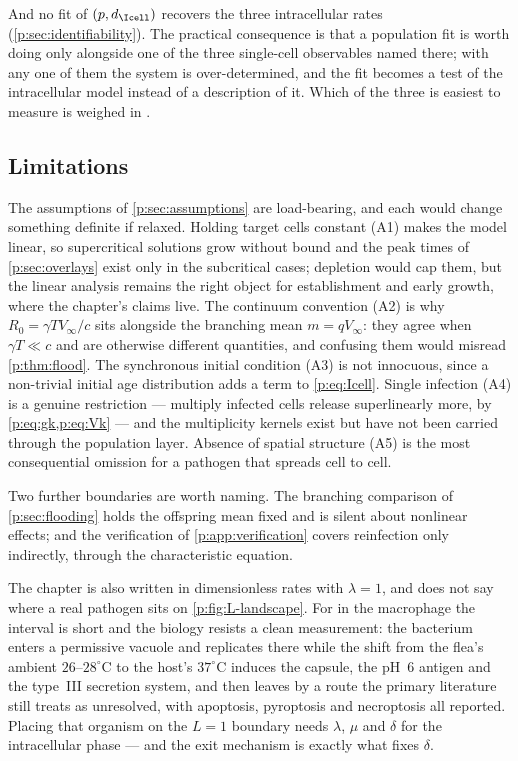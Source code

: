 And no fit of $(p,d_{\Icell})$ recovers the three intracellular rates
(\cref{p:sec:identifiability}). The practical consequence is that a
population fit is worth doing only alongside one of the three single-cell
observables named there; with any one of them the system is
over-determined, and the fit becomes a test of the intracellular model
instead of a description of it. Which of the three is easiest to measure is
weighed in \ChDist{}.

\subsection{Limitations}
\label{p:sec:limitations}

The assumptions of \cref{p:sec:assumptions} are load-bearing, and each
would change something definite if relaxed. Holding target cells constant
(A1) makes the model linear, so supercritical solutions grow without bound
and the peak times of \cref{p:sec:overlays} exist only in the subcritical
cases; depletion would cap them, but the linear analysis remains the right
object for establishment and early growth, where the chapter's claims live.
The continuum convention (A2) is why $R_0=\gamma TV_\infty/c$ sits alongside
the branching mean $m=qV_\infty$: they agree when $\gamma T\ll c$ and are
otherwise different quantities, and confusing them would misread
\cref{p:thm:flood}. The synchronous initial condition (A3) is not innocuous,
since a non-trivial initial age distribution adds a term to
\cref{p:eq:Icell}. Single infection (A4) is a genuine restriction ---
multiply infected cells release superlinearly more, by
\cref{p:eq:gk,p:eq:Vk} --- and the multiplicity kernels exist but have not
been carried through the population layer. Absence of spatial structure (A5)
is the most consequential omission for a pathogen that spreads cell to cell.

Two further boundaries are worth naming. The branching comparison of
\cref{p:sec:flooding} holds the offspring mean fixed and is silent about
nonlinear effects; and the verification of \cref{p:app:verification} covers
reinfection only indirectly, through the characteristic equation.

The chapter is also written in dimensionless rates with $\lambda=1$, and
does not say where a real pathogen sits on \cref{p:fig:L-landscape}. For
\yp{} in the macrophage the interval is short and the biology resists a
clean measurement: the bacterium enters a permissive vacuole and replicates
there while the shift from the flea's ambient $26$--$28^\circ$C to the host's
$37^\circ$C induces the capsule, the pH~6 antigen and the type~III secretion
system, and then leaves by a route the primary literature still treats as
unresolved, with apoptosis, pyroptosis and necroptosis all reported. Placing
that organism on the $L=1$ boundary needs $\lambda$, $\mu$ and $\delta$ for
the intracellular phase --- and the exit mechanism is exactly what fixes
$\delta$.


